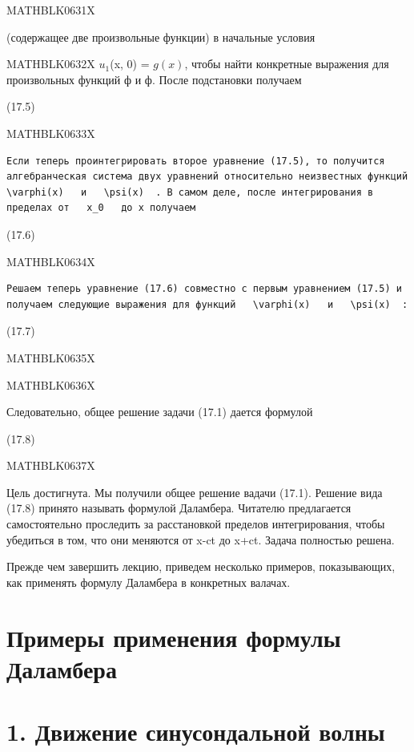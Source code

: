 \documentclass[
]{article}
\begin{document}
{{MATHBLK0631X

(содержащее две произвольные функции) в начальные условия

MATHBLK0632X \(u_1\)(x, 0) = \(g(x)\), чтобы найти конкретные выражения
для произвольных функций ф и ф. После подстановки получаем

(17.5)

MATHBLK0633X

\begin{verbatim}
Если теперь проинтегрировать второе уравнение (17.5), то получится алгебранческая система двух уравнений относительно неизвестных функций   \varphi(x)   и   \psi(x)  . В самом деле, после интегрирования в пределах от   x_0   до x получаем
\end{verbatim}

(17.6)

MATHBLK0634X

\begin{verbatim}
Решаем теперь уравнение (17.6) совместно с первым уравнением (17.5) и получаем следующие выражения для функций   \varphi(x)   и   \psi(x)  :
\end{verbatim}

(17.7)

MATHBLK0635X

MATHBLK0636X

Следовательно, общее решение задачи (17.1) дается формулой

(17.8)

MATHBLK0637X

Цель достигнута. Мы получили общее решение вадачи (17.1). Решение вида
(17.8) принято называть формулой Даламбера. Читателю предлагается
самостоятельно проследить за расстановкой пределов интегрирования, чтобы
убедиться в том, что они меняются от x-ct до x+ct. Задача полностью
решена.

Прежде чем завершить лекцию, приведем несколько примеров, показывающих,
как применять формулу Даламбера в конкретных валачах.

\section{Примеры применения формулы
Даламбера}\label{ux43fux440ux438ux43cux435ux440ux44b-ux43fux440ux438ux43cux435ux43dux435ux43dux438ux44f-ux444ux43eux440ux43cux443ux43bux44b-ux434ux430ux43bux430ux43cux431ux435ux440ux430}

\section{1. Движение синусондальной
волны}\label{ux434ux432ux438ux436ux435ux43dux438ux435-ux441ux438ux43dux443ux441ux43eux43dux434ux430ux43bux44cux43dux43eux439-ux432ux43eux43bux43dux44b}

}}
\end{document}

